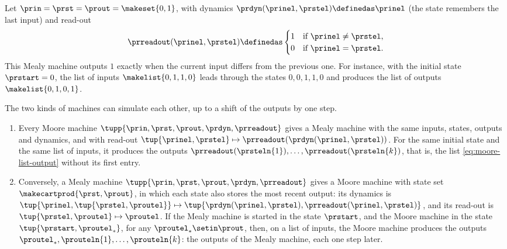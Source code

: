\begin{example}
    \label{exa:mealy-change-detector}
    Let $\prin = \prst = \prout = \makeset{0, 1}$, with dynamics $\prdyn(\prinel, \prstel) \definedas \prinel$ (the state remembers the last input) and read-out
    \begin{equation}
        \prreadout(\prinel, \prstel) \definedas
        \begin{cases}
            1 & \text{if } \prinel \neq \prstel, \\
            0 & \text{if } \prinel = \prstel.
        \end{cases}
    \end{equation}
    This Mealy machine outputs $1$ exactly when the current input differs from the previous one.
    For instance, with the initial state $\prstart = 0$, the list of inputs $\makelist{0, 1, 1, 0}$ leads through the states $0, 0, 1, 1, 0$ and produces the list of outputs $\makelist{0, 1, 0, 1}$.
\end{example}

\begin{remark}
    \label{rem:moore-vs-mealy}
    The two kinds of machines can simulate each other, up to a shift of the outputs by one step.
    \begin{enumerate}
        \item Every Moore machine $\tupp{\prin,\prst,\prout,\prdyn,\prreadout}$ gives a Mealy machine with the same inputs, states, outputs and dynamics, and with read-out $\tup{\prinel, \prstel} \mapsto \prreadout(\prdyn(\prinel, \prstel))$.
              For the same initial state and the same list of inputs, it produces the outputs $\prreadout(\prsteln{1}), \dots, \prreadout(\prsteln{k})$, that is, the list \cref{eq:moore-list-output} without its first entry.
        \item Conversely, a Mealy machine $\tupp{\prin,\prst,\prout,\prdyn,\prreadout}$ gives a Moore machine with state set $\makecartprod{\prst, \prout}$, in which each state also stores the most recent output: its dynamics is $\tup{\prinel, \tup{\prstel, \proutel}} \mapsto \tup{\prdyn(\prinel, \prstel), \prreadout(\prinel, \prstel)}$, and its read-out is $\tup{\prstel, \proutel} \mapsto \proutel$.
              If the Mealy machine is started in the state $\prstart$, and the Moore machine in the state $\tup{\prstart, \proutel_\ast}$, for any $\proutel_\ast \setin \prout$, then, on a list of inputs, the Moore machine produces the outputs $\proutel_\ast, \prouteln{1}, \dots, \prouteln{k}$: the outputs of the Mealy machine, each one step later.
    \end{enumerate}
\end{remark}


